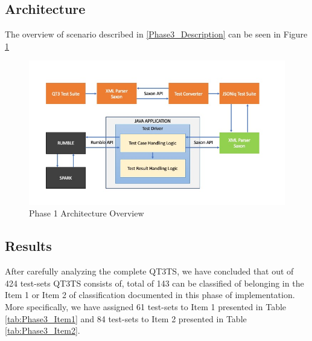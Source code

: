 \subsection{Architecture}
The overview of scenario described in \ref{Phase3_Description} can be seen in Figure \ref{fig:Phase3_Architecture}
\begin{figure}[h!]
	\vspace*{-5mm}
	\includegraphics[width=\linewidth]{architecture_diagram_phase_3.jpg}
	\vspace*{-15mm}
	\caption{Phase 1 Architecture Overview}
	\label{fig:Phase3_Architecture}
\end{figure}

\subsection{Results}
After carefully analyzing the complete QT3TS, we have concluded that out of 424 test-sets QT3TS consists of, total of 143 can be classified of belonging in the Item 1 or Item 2 of classification documented in this phase of implementation. More specifically, we have assigned 61 test-sets to Item 1 presented in Table \ref{tab:Phase3_Item1} and 84 test-sets to Item 2 presented in Table \ref{tab:Phase3_Item2}.

